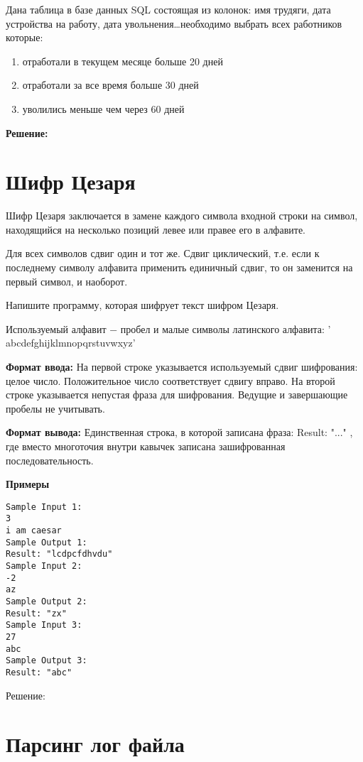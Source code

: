	Дана таблица в базе данных SQL состоящая из колонок: имя трудяги, дата устройства на работу, дата увольнения\dots необходимо выбрать всех работников которые:
	\begin{enumerate}
	\item отработали в текущем месяце больше 20 дней
	\item отработали за все время больше 30 дней
	\item уволились меньше чем через 60 дней
	\end{enumerate}
	
	\textbf{Решение:}
	
	
	
	\section{Шифр Цезаря}
Шифр Цезаря заключается в замене каждого символа входной строки на символ, находящийся на несколько позиций левее или правее его в алфавите.

Для всех символов сдвиг один и тот же. Сдвиг циклический, т.е. если к последнему символу алфавита применить единичный сдвиг, то он заменится на первый символ, и наоборот.

Напишите программу, которая шифрует текст шифром Цезаря.

Используемый алфавит − пробел и малые символы латинского алфавита: ' abcdefghijklmnopqrstuvwxyz'

\textbf{Формат ввода:}
На первой строке указывается используемый сдвиг шифрования: целое число. Положительное число соответствует сдвигу вправо. На второй строке указывается непустая фраза для шифрования. Ведущие и завершающие пробелы не учитывать.

\textbf{Формат вывода:}
Единственная строка, в которой записана фраза: Result: "..." , где вместо многоточия внутри кавычек записана зашифрованная последовательность.

\textbf{Примеры}

\begin{lstlisting}
Sample Input 1:
3
i am caesar
Sample Output 1:
Result: "lcdpcfdhvdu"
Sample Input 2:
-2
az
Sample Output 2:
Result: "zx"
Sample Input 3:
27
abc
Sample Output 3:
Result: "abc"
\end{lstlisting}

Решение:

\linenumbers
{}
\nolinenumbers

\section{Парсинг лог файла}


